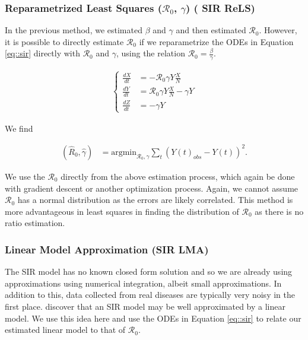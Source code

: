 \documentclass[12pt]{article}
\newcommand{\rr}{\ensuremath{\mathcal{R}_0}}
\begin{document}
\subsubsection{Reparametrized Least Squares ($\rr$, $\gamma$) ( SIR ReLS)}\label{reparametrized-least-squares-rux5f0-gamma}

In the previous method, we estimated $\beta$ and $\gamma$ and then estimated $\rr$.  However, it is possible to directly estimate $\rr$ if we reparametrize the ODEs in Equation \eqref{eq::sir} directly with \(\rr\) and \(\gamma\), using the relation $\rr = \frac{\beta}{\gamma}$.

\begin{align*}
  \left \{
  \begin{array}{cl}
    \frac{dX}{dt} &= - \rr \gamma Y \frac{X}{N}\\
    \frac{dY}{dt} &=  \rr \gamma Y \frac{X}{N}  - \gamma Y \\
    \frac{dZ}{dt} &=  - \gamma Y 
  \end{array}
  \right .
  \end{align*}

We find

\begin{align*}
(\hat{R}_0, \hat{\gamma} )&=\text{argmin}_{\rr, \gamma} \sum_{t} (Y(t)_{obs} - Y(t))^2 .
\end{align*}

We use the \(\rr\) directly from the above estimation process, which again be done with gradient descent or another optimization process.  Again, we cannot assume $\rr$ has a normal distribution as the errors are likely correlated.  This method is more advantageous in least squares in finding the distribution of $\rr$ as there is no ratio estimation.



\subsubsection{Linear Model Approximation (SIR LMA)}\label{linear-model-approximation-degree-10}

The SIR model has no known closed form solution and so we are already using approximations using numerical integration, albeit small approximations.  In addition to this, data collected from real diseases are typically very noisy in the first place.  \cite{chang2017} discover that an SIR model may be well approximated by a linear model.  We use this idea here and use the ODEs in Equation \eqref{eq::sir} to relate our estimated linear model to that of $\rr$.
\end{document}
